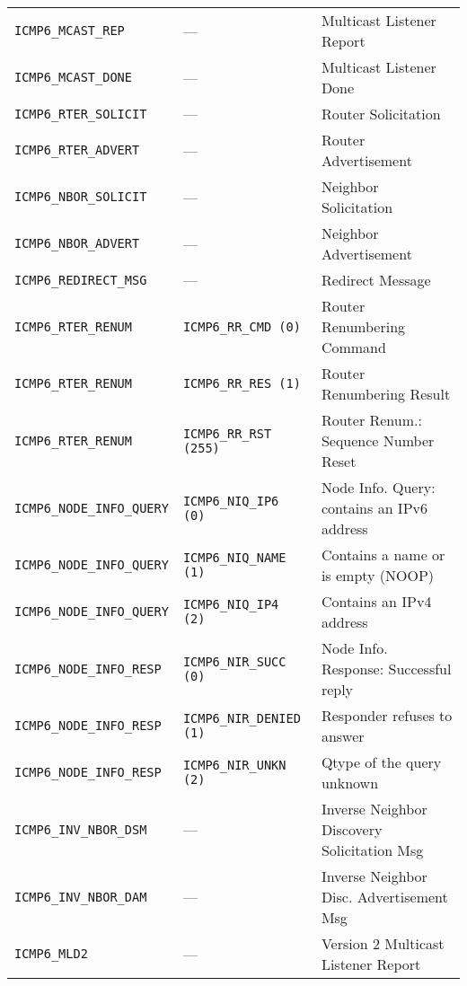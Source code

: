 \documentclass[documentation]{subfiles}
\begin{document}
\begin{longtable}{lll}
    {\tt ICMP6\_MCAST\_REP}        & ---                            & Multicast Listener Report\\
    {\tt ICMP6\_MCAST\_DONE}       & ---                            & Multicast Listener Done\\
    {\tt ICMP6\_RTER\_SOLICIT}     & ---                            & Router Solicitation\\
    {\tt ICMP6\_RTER\_ADVERT}      & ---                            & Router Advertisement\\
    {\tt ICMP6\_NBOR\_SOLICIT}     & ---                            & Neighbor Solicitation\\
    {\tt ICMP6\_NBOR\_ADVERT}      & ---                            & Neighbor Advertisement\\
    {\tt ICMP6\_REDIRECT\_MSG}     & ---                            & Redirect Message\\
    {\tt ICMP6\_RTER\_RENUM}       & {\tt ICMP6\_RR\_CMD (0)}       & Router Renumbering Command\\
    {\tt ICMP6\_RTER\_RENUM}       & {\tt ICMP6\_RR\_RES (1)}       & Router Renumbering Result\\
    {\tt ICMP6\_RTER\_RENUM}       & {\tt ICMP6\_RR\_RST (255)}     & Router Renum.: Sequence Number Reset\\
    {\tt ICMP6\_NODE\_INFO\_QUERY} & {\tt ICMP6\_NIQ\_IP6 (0)}      & Node Info. Query: contains an IPv6 address\\
    {\tt ICMP6\_NODE\_INFO\_QUERY} & {\tt ICMP6\_NIQ\_NAME (1)}     & Contains a name or is empty (NOOP)\\
    {\tt ICMP6\_NODE\_INFO\_QUERY} & {\tt ICMP6\_NIQ\_IP4 (2)}      & Contains an IPv4 address\\
    {\tt ICMP6\_NODE\_INFO\_RESP}  & {\tt ICMP6\_NIR\_SUCC (0)}     & Node Info. Response: Successful reply\\
    {\tt ICMP6\_NODE\_INFO\_RESP}  & {\tt ICMP6\_NIR\_DENIED (1)}   & Responder refuses to answer\\
    {\tt ICMP6\_NODE\_INFO\_RESP}  & {\tt ICMP6\_NIR\_UNKN (2)}     & Qtype of the query unknown\\
    {\tt ICMP6\_INV\_NBOR\_DSM}    & ---                            & Inverse Neighbor Discovery Solicitation Msg\\
    {\tt ICMP6\_INV\_NBOR\_DAM}    & ---                            & Inverse Neighbor Disc. Advertisement Msg\\
    {\tt ICMP6\_MLD2}              & ---                            & Version 2 Multicast Listener Report\\

\end{longtable}
\end{document}
